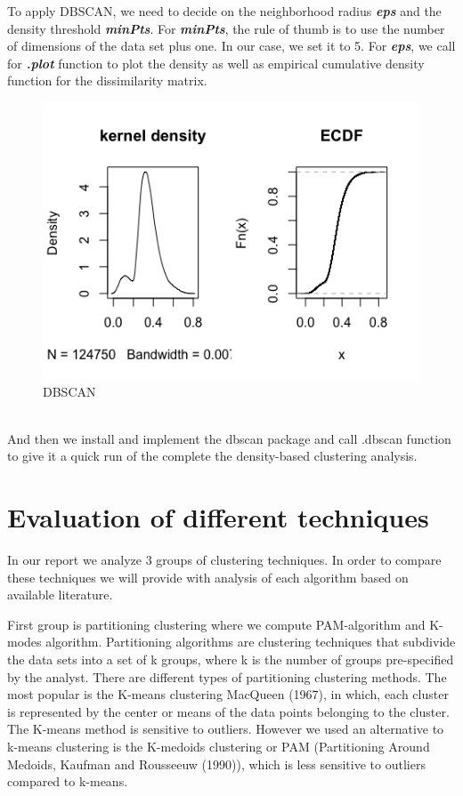 \documentclass[a4paper,12pt,fleqn]{article}
\begin{document}
To apply DBSCAN, we need to decide on the neighborhood radius \textbf{\textit{eps}} and the density threshold \textbf{\textit{minPts}}. For \textbf{\textit{minPts}}, the rule of thumb is to use the number of dimensions of the data set plus one. In our case, we set it to 5. For \textbf{\textit{eps}}, we call for \textbf{\textit{.plot}} function to plot the density as well as empirical cumulative density function for the dissimilarity matrix.
\begin{figure}[h!]
	\includegraphics[width=0.7\linewidth]{19.DBSCAN}
	\caption{DBSCAN}
	\label{fig:19}
\end{figure}\\
And then we install and implement the dbscan package and call .dbscan function to give it a quick run of the complete the density-based clustering analysis. \\

\newpage
\section{Evaluation of different techniques }		
In our report we analyze 3 groups of clustering techniques. In order to compare these techniques we will provide with analysis of each algorithm based on available literature.

First group is partitioning clustering where we compute PAM-algorithm and K-modes algorithm. Partitioning algorithms are clustering techniques that subdivide the data sets into a set of k groups, where k is the number of groups pre-specified by the analyst. There are different types of partitioning clustering methods. The most popular is the K-means clustering MacQueen (1967), in which, each cluster is represented by the center or means of the data points belonging to the cluster. The K-means method is sensitive to outliers. However we used an alternative to k-means clustering is the K-medoids clustering or PAM (Partitioning Around Medoids, Kaufman and Rousseeuw (1990)), which is less sensitive to outliers compared to k-means.
\end{document}

